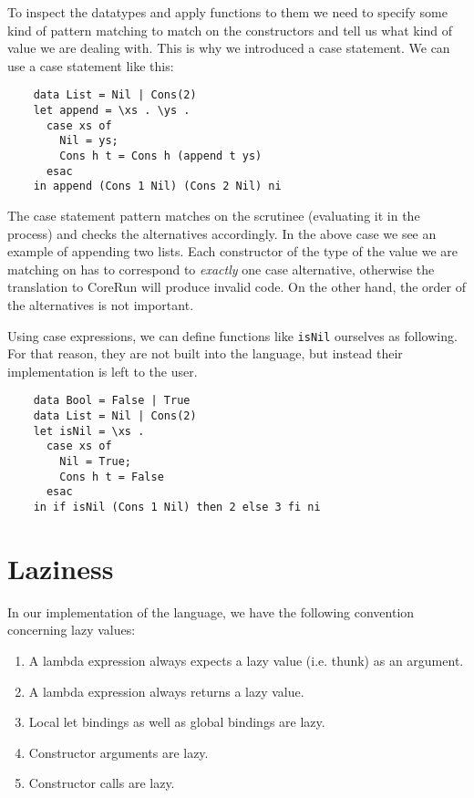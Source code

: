 \documentclass{scrartcl}
\begin{document}
To inspect the datatypes and apply functions to them we need to specify some kind of pattern matching to match on the constructors and tell us what kind of value we are dealing with. This is why we introduced a case statement. We can use a case statement like this:

\begin{lstlisting}
    data List = Nil | Cons(2)
    let append = \xs . \ys . 
      case xs of
        Nil = ys;
        Cons h t = Cons h (append t ys)
      esac 
    in append (Cons 1 Nil) (Cons 2 Nil) ni
\end{lstlisting}

The case statement pattern matches on the scrutinee (evaluating it in the process) and checks the alternatives accordingly. 
In the above case we see an example of appending two lists.
Each constructor of the type of the value we are matching on has to correspond to \emph{exactly} one case alternative, otherwise the translation to CoreRun will produce invalid code. On the other hand, the order of the alternatives is not important.

Using case expressions, we can define functions like \lstinline|isNil| ourselves as following. For that reason, they are not built into the language, but instead their implementation is left to the user.

\begin{lstlisting}
    data Bool = False | True
    data List = Nil | Cons(2)
    let isNil = \xs . 
      case xs of
        Nil = True;
        Cons h t = False
      esac 
    in if isNil (Cons 1 Nil) then 2 else 3 fi ni
\end{lstlisting}

\section{Laziness}

In our implementation of the language, we have the following convention concerning lazy values:

\begin{enumerate}
\item A lambda expression always expects a lazy value (i.e. thunk) as an argument.
\item A lambda expression always returns a lazy value.
\item Local let bindings as well as global bindings are lazy.
\item Constructor arguments are lazy.
\item Constructor calls are lazy.
\end{enumerate}
\end{document}
